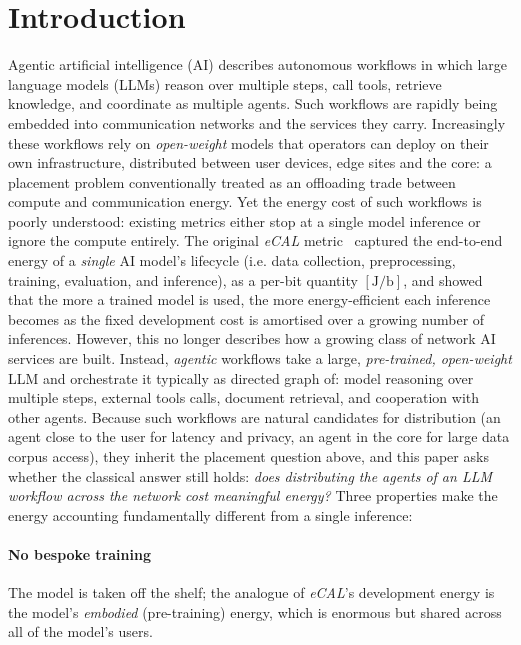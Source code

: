 \documentclass[journal]{IEEEtran}
\newcommand{\ecal}{\textit{eCAL}}
\begin{document}
\section{Introduction}

Agentic artificial intelligence (AI) describes autonomous workflows in which large language models
(LLMs) reason over multiple steps, call tools, retrieve knowledge, and coordinate as multiple
agents. Such workflows are rapidly being embedded into communication networks and the services
they carry. Increasingly these
workflows rely on \emph{open-weight} models that operators can deploy on their own infrastructure,
distributed between user devices, edge sites and the core: a placement problem conventionally treated as an offloading trade between compute and communication energy. Yet the energy cost of such workflows is poorly understood: existing metrics either stop at a single
model inference or ignore the compute entirely. The original \ecal{}
metric~\cite{chou2026ecal} captured
the end-to-end energy of a \emph{single} AI model's lifecycle (i.e. data collection, preprocessing,
training, evaluation, and inference), as a per-bit quantity $[\mathrm{J/b}]$, and showed that the
more a trained model is used, the more energy-efficient each inference becomes as the fixed
development cost is amortised over a growing number of inferences. However, this no
longer describes how a growing class of network AI services are built. Instead, \emph{agentic}
workflows take a large, \emph{pre-trained, open-weight} LLM and orchestrate it typically as directed graph of: model reasoning 
over multiple steps, external tools calls, document retrieval, and cooperation with other agents. Because such workflows are natural candidates for distribution (an agent
close to the user for latency and privacy, an agent in the core for large data corpus access), they inherit
the placement question above, and this paper asks whether the classical answer still holds:
\emph{does
distributing the agents of an LLM workflow across the network cost meaningful energy?} Three
properties make the energy accounting fundamentally different from a single
inference: 
\paragraph{No bespoke training} The model is taken off the shelf; the analogue of \ecal{}'s
  development energy is the model's \emph{embodied} (pre-training) energy, which is enormous but
  shared across all of the model's users.
\end{document}
